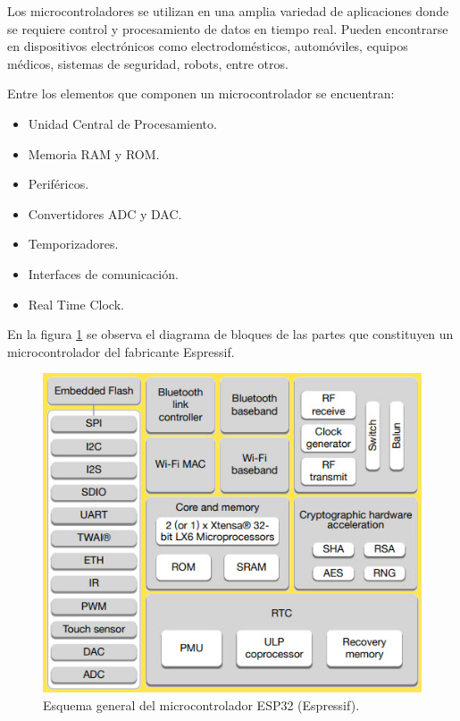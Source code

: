 Los microcontroladores se utilizan en una amplia variedad de aplicaciones donde se requiere control y procesamiento de datos en tiempo real. Pueden encontrarse en dispositivos electrónicos como electrodomésticos, automóviles, equipos médicos, sistemas de seguridad, robots, entre otros.

Entre los elementos que componen un microcontrolador se encuentran:

\begin{itemize}
    \item Unidad Central de Procesamiento.
    \item Memoria RAM y ROM.
    \item Periféricos.
    \item Convertidores ADC y DAC.
    \item Temporizadores.
    \item Interfaces de comunicación.
    \item Real Time Clock.
\end{itemize}

En la figura \ref{fig:ESP32_Block_Diagram} se observa el diagrama de bloques de las partes que constituyen un microcontrolador del fabricante Espressif.

\begin{figure}[H]
    \centering
    \includegraphics[width = \textwidth]{imagenes/cap1_marcoteo/ESP32-Block-Diagram.jpg}
    \caption{Esquema general del microcontrolador ESP32 (Espressif).}
    \label{fig:ESP32_Block_Diagram}
\end{figure}

